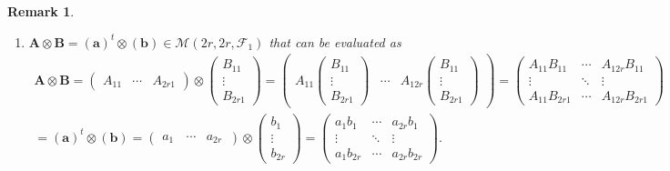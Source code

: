 \documentclass[aps,preprint]{revtex4}
\newtheorem{remark}[theorem]{Remark}
\begin{document}
\begin{remark}
\begin{enumerate}
\begin{enumerate}
\item $\boldsymbol{A}\otimes \boldsymbol{B}=\left( \boldsymbol{a}\right)
^{t}\otimes \left( \boldsymbol{b}\right) \in \mathcal{M}\left( 2r,2r,%
\mathcal{F}_{1}\right) $ that can be evaluated as 
\begin{gather}
\boldsymbol{A}\otimes \boldsymbol{B}=\left( 
\begin{array}{ccc}
A_{11} & \cdots & A_{2r1}%
\end{array}%
\right) \otimes \left( 
\begin{array}{c}
B_{11} \\ 
\vdots \\ 
B_{2r1}%
\end{array}%
\right) =\left( 
\begin{array}{ccc}
A_{11}\left( 
\begin{array}{c}
B_{11} \\ 
\vdots \\ 
B_{2r1}%
\end{array}%
\right) & \cdots & A_{12r}\left( 
\begin{array}{c}
B_{11} \\ 
\vdots \\ 
B_{2r1}%
\end{array}%
\right)%
\end{array}%
\right) =\left( 
\begin{array}{ccc}
A_{11}B_{11} & \cdots & A_{12r}B_{11} \\ 
\vdots & \ddots & \vdots \\ 
A_{11}B_{2r1} & \cdots & A_{12r}B_{2r1}%
\end{array}%
\right) \\
=\left( \boldsymbol{a}\right) ^{t}\otimes \left( \boldsymbol{b}\right)
=\left( 
\begin{array}{ccc}
a_{1\ } & \cdots & a_{2r\ }%
\end{array}%
\right) \otimes \left( 
\begin{array}{c}
b_{1} \\ 
\vdots \\ 
b_{2r}%
\end{array}%
\right) =\left( 
\begin{array}{ccc}
a_{1}b_{1} & \cdots & a_{2r}b_{1} \\ 
\vdots & \ddots & \vdots \\ 
a_{1}b_{2r} & \cdots & a_{2r}b_{2r}%
\end{array}%
\right) .
\end{gather}


\end{enumerate}
\end{enumerate}
\end{remark}
\end{document}
